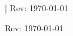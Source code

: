 

    {\thepage\quad|\quad\rightmark}
    {}
    {}
    {Rev: \texttt{\VCRevisionMod}}
    {}
    {\today}

    {}
    {}
    {\quad\thepage}
    {Rev: \texttt{\VCRevisionMod}}
    {}
    {\today}
